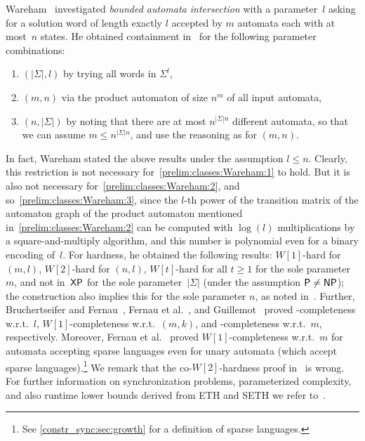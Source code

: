 Wareham~\cite{DBLP:conf/wia/Wareham00} investigated \emph{bounded automata intersection}
with a parameter~$l$ asking for a solution word
of length exactly $l$
accepted by $m$ automata
each with at most~$n$ states.
He obtained containment in \FPT\  for the following parameter combinations:
\begin{enumerate}
	\item \label{prelim:classes:Wareham:1} $(|\Sigma|, l)$ by trying all words in $\Sigma^{l}$,
	
	
	\item \label{prelim:classes:Wareham:2} $(m,n)$ via the product automaton of size $n^m$
	of all input automata, 
	
	\item  \label{prelim:classes:Wareham:3} $(n, |\Sigma|)$ by noting that there are at most $n^{|\Sigma|n}$
	different automata, so that we can assume $m \le n^{|\Sigma|n}$, and use
	the reasoning as for $(m,n)$.
\end{enumerate}
In fact, Wareham stated the above
results under the assumption $l \le n$. 
Clearly, this restriction is not necessary for~\ref{prelim:classes:Wareham:1} to hold.
But it is also not necessary for~\ref{prelim:classes:Wareham:2},
and so~\ref{prelim:classes:Wareham:3}, 
since the $l$-th power of the transition matrix of the automaton graph of the product
automaton mentioned in~\ref{prelim:classes:Wareham:2} 
can be computed with $\log(l)$ multiplications
by a square-and-multiply algorithm,
and this number is polynomial even for a binary encoding of~$l$.
For hardness, he obtained the following results:
$W[1]$-hard for $(m,l)$, $W[2]$-hard for $(n, l)$,
$W[t]$-hard for all $t \ge 1$ for the sole parameter $m$,
and not in~$\textup{\textsf{XP}}$ for the sole parameter~$|\Sigma|$ (under the assumption $\textup{\textsf{P}} \ne \textup{\textsf{NP}}$);
the construction also implies this for the sole parameter $n$, as noted in~\cite{DBLP:journals/corr/abs-2108-05244}.
Further, Bruchertseifer and Fernau~\cite[Thm.~9]{DBLP:journals/mscs/FernauB22}, Fernau et al.~\cite[Cor.~2.2]{DBLP:journals/corr/abs-2108-05244}, and Guillemot~\cite[Prop.~10]{DBLP:journals/disopt/Guillemot11} 
proved \WSYNC-completeness w.r.t.~$l$, $W[1]$-completeness w.r.t.~$(m, k)$, and \WNL-completeness w.r.t.~$m$, respectively.
Moreover, Fernau et al.~\cite[Thm.~5.8]{DBLP:journals/corr/abs-2108-05244} 
proved $W[1]$-completeness w.r.t.~$m$
for automata accepting sparse languages even for
unary automata (which accept sparse languages).\footnote{See \cref{constr_sync:sec:growth} for a definition of sparse languages.}
We remark that the co-$W[2]$-hardness proof in~\cite[Prop.~6.3]{DBLP:journals/corr/abs-2108-05244}
is wrong.
For further information on synchronization
problems, parameterized complexity,
and also runtime lower bounds derived from ETH and SETH 
we refer to~\cite{DBLP:journals/ita/BruchertseiferF21,DBLP:journals/jcss/FernauHV15}.

